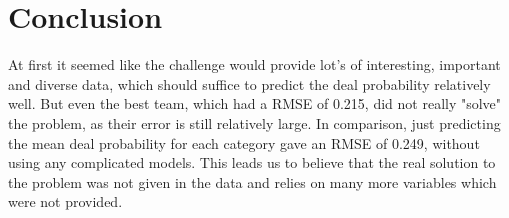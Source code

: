 \documentclass[runningheads]{llncs}
\begin{document}
 \section{Conclusion}
At first it seemed like the challenge would provide lot's of interesting, important and diverse data, which should suffice to predict the deal probability relatively well. But even the best team, which had a RMSE of 0.215, did not really "solve" the problem, as their error is still relatively large. In comparison, just predicting the mean deal probability for each category gave an RMSE of 0.249, without using any complicated models. This leads us to believe that the real solution to the problem was not given in the data and relies on many more variables which were not provided.
\end{document}
